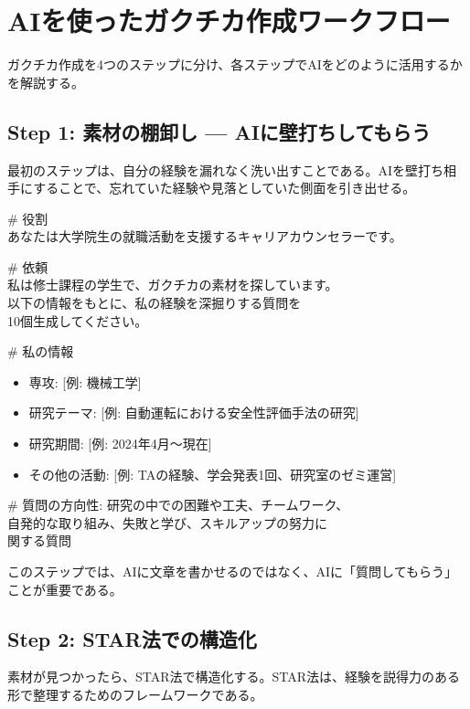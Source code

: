 \section{AIを使ったガクチカ作成ワークフロー}

ガクチカ作成を4つのステップに分け、各ステップでAIをどのように活用するかを解説する。

\subsection{Step 1: 素材の棚卸し --- AIに壁打ちしてもらう}

最初のステップは、自分の経験を漏れなく洗い出すことである。AIを壁打ち相手にすることで、忘れていた経験や見落としていた側面を引き出せる。

\begin{promptbox}
\# 役割\\
あなたは大学院生の就職活動を支援するキャリアカウンセラーです。

\# 依頼\\
私は修士課程の学生で、ガクチカの素材を探しています。\\
以下の情報をもとに、私の経験を深掘りする質問を\\
10個生成してください。

\# 私の情報
\begin{itemize}
\item 専攻: [例: 機械工学]
\item 研究テーマ: [例: 自動運転における安全性評価手法の研究]
\item 研究期間: [例: 2024年4月〜現在]
\item その他の活動: [例: TAの経験、学会発表1回、研究室のゼミ運営]
\end{itemize}

\# 質問の方向性: 研究の中での困難や工夫、チームワーク、\\
自発的な取り組み、失敗と学び、スキルアップの努力に\\
関する質問
\end{promptbox}

このステップでは、AIに文章を書かせるのではなく、AIに「質問してもらう」ことが重要である。

\subsection{Step 2: STAR法での構造化}

素材が見つかったら、STAR法で構造化する。STAR法は、経験を説得力のある形で整理するためのフレームワークである。

